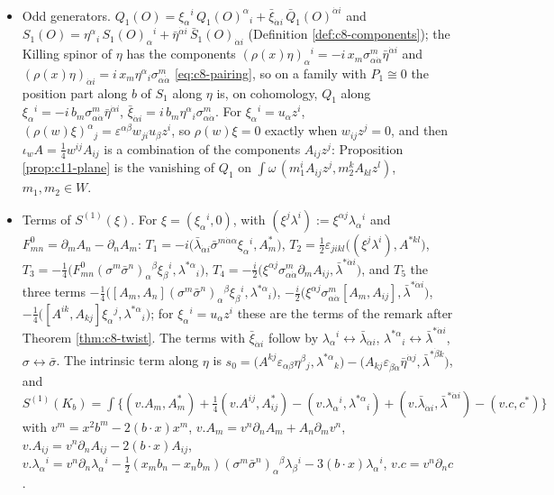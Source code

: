 \begin{remark}
\begin{itemize}
\item Odd generators. $Q_1(O)=\xi_\alpha{}^i\,Q_1(O)^\alpha{}_i+\bar\xi_{\dot\alpha i}\,\bar Q_1(O)^{\dot\alpha i}$ and $S_1(O)=\eta^\alpha{}_i\,S_1(O)_\alpha{}^i+\bar\eta^{\dot\alpha i}\,\bar S_1(O)_{\dot\alpha i}$ (Definition \ref{def:c8-components}); the Killing spinor of $\eta$ has the components $(\rho(x)\eta)_\alpha{}^i=-i\,x_m\sigma^m_{\alpha\dot\alpha}\bar\eta^{\dot\alpha i}$ and $(\rho(x)\eta)_{\dot\alpha i}=i\,x_m\eta^\alpha{}_i\sigma^m_{\alpha\dot\alpha}$ \eqref{eq:c8-pairing}, so on a family with $P_1\cong0$ the position part along $b$ of $S_1$ along $\eta$ is, on cohomology, $Q_1$ along $\xi_\alpha{}^i=-i\,b_m\sigma^m_{\alpha\dot\alpha}\bar\eta^{\dot\alpha i}$, $\bar\xi_{\dot\alpha i}=i\,b_m\eta^\alpha{}_i\sigma^m_{\alpha\dot\alpha}$. For $\xi_\alpha{}^i=u_\alpha z^i$, $(\rho(w)\xi)^\alpha{}_j=\varepsilon^{\alpha\beta}w_{ji}u_\beta z^i$, so $\rho(w)\xi=0$ exactly when $w_{ij}z^j=0$, and then $\iota_wA=\tfrac14w^{ij}A_{ij}$ is a combination of the components $A_{ij}z^j$: Proposition \ref{prop:c11-plane} is the vanishing of $Q_1$ on $\int\omega\,(m_1^iA_{ij}z^j,m_2^kA_{kl}z^l)$, $m_1,m_2\in W$.
\item Terms of $S^{(1)}(\xi)$. For $\xi=(\xi_\alpha{}^i,0)$, with $(\xi^j\lambda^i):=\xi^{\alpha j}\lambda_\alpha{}^i$ and $F^0_{mn}=\partial_mA_n-\partial_nA_m$: $T_1=-i\big(\bar\lambda_{\dot\alpha i}\bar\sigma^{m\dot\alpha\alpha}\xi_\alpha{}^i,A^*_m\big)$, $T_2=\tfrac12\varepsilon_{jikl}\big((\xi^j\lambda^i),A^{*kl}\big)$, $T_3=-\tfrac14\big(F^0_{mn}(\sigma^m\bar\sigma^n)_\alpha{}^\beta\xi_\beta{}^i,\lambda^{*\alpha}{}_i\big)$, $T_4=-\tfrac i2\big(\xi^{\alpha j}\sigma^m_{\alpha\dot\alpha}\partial_mA_{ij},\bar\lambda^{*\dot\alpha i}\big)$, and $T_5$ the three terms $-\tfrac14\big([A_m,A_n](\sigma^m\bar\sigma^n)_\alpha{}^\beta\xi_\beta{}^i,\lambda^{*\alpha}{}_i\big)$, $-\tfrac i2\big(\xi^{\alpha j}\sigma^m_{\alpha\dot\alpha}[A_m,A_{ij}],\bar\lambda^{*\dot\alpha i}\big)$, $-\tfrac14\big([A^{ik},A_{kj}]\xi_\alpha{}^j,\lambda^{*\alpha}{}_i\big)$; for $\xi_\alpha{}^i=u_\alpha z^i$ these are the terms of the remark after Theorem \ref{thm:c8-twist}. The terms with $\bar\xi_{\dot\alpha i}$ follow by $\lambda_\alpha{}^i\leftrightarrow\bar\lambda_{\dot\alpha i}$, $\lambda^{*\alpha}{}_i\leftrightarrow\bar\lambda^{*\dot\alpha i}$, $\sigma\leftrightarrow\bar\sigma$. The intrinsic term along $\eta$ is $s_0=\big(A^{kj}\varepsilon_{\alpha\beta}\eta^\beta{}_j,\lambda^{*\alpha}{}_k\big)-\big(A_{kj}\varepsilon_{\dot\beta\dot\alpha}\bar\eta^{\dot\alpha j},\bar\lambda^{*\dot\beta k}\big)$, and $S^{(1)}(K_b)=\int\big\{(v.A_m,A^*_m)+\tfrac14(v.A^{ij},A^*_{ij})-(v.\lambda_\alpha{}^i,\lambda^{*\alpha}{}_i)+(v.\bar\lambda_{\dot\alpha i},\bar\lambda^{*\dot\alpha i})-(v.c,c^*)\big\}$ with $v^m=x^2b^m-2(b\cdot x)x^m$, $v.A_m=v^n\partial_nA_m+A_n\partial_mv^n$, $v.A_{ij}=v^n\partial_nA_{ij}-2(b\cdot x)A_{ij}$, $v.\lambda_\alpha{}^i=v^n\partial_n\lambda_\alpha{}^i-\tfrac12(x_mb_n-x_nb_m)(\sigma^m\bar\sigma^n)_\alpha{}^\beta\lambda_\beta{}^i-3(b\cdot x)\lambda_\alpha{}^i$, $v.c=v^n\partial_nc$.

\end{itemize}
\end{remark}
